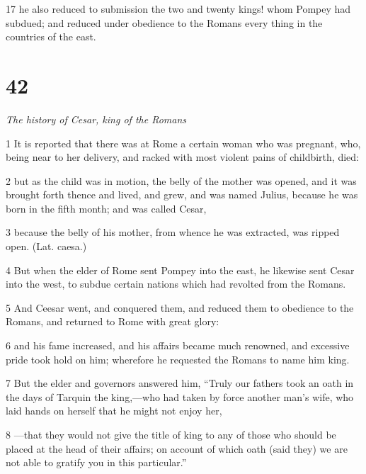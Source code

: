 \par 17 he also reduced to submission the two and twenty kings! whom Pompey had subdued; and reduced under obedience to the Romans every thing in the countries of the east. 

\chapter{42}

\par \textit{The history of Cesar, king of the Romans}

\par 1 It is reported that there was at Rome a certain woman who was pregnant, who, being near to her delivery, and racked with most violent pains of childbirth, died: 

\par 2 but as the child was in motion, the belly of the mother was opened, and it was brought forth thence and lived, and grew, and was named Julius, because he was born in the fifth month; and was called Cesar, 

\par 3 because the belly of his mother, from whence he was extracted, was ripped open. (Lat. caesa.) 

\par 4 But when the elder of Rome sent Pompey into the east, he likewise sent Cesar into the west, to subdue certain nations which had revolted from the Romans. 

\par 5 And Ceesar went, and conquered them, and reduced them to obedience to the Romans, and returned to Rome with great glory: 

\par 6 and his fame increased, and his affairs became much renowned, and excessive pride took hold on him; wherefore he requested the Romans to name him king. 

\par 7 But the elder and governors answered him, “Truly our fathers took an oath in the days of Tarquin the king,—who had taken by force another man’s wife, who laid hands on herself that he might not enjoy her,

\par 8 —that they would not give the title of king to any of those who should be placed at the head of their affairs; on account of which oath (said they) we are not able to gratify you in this particular.” 

